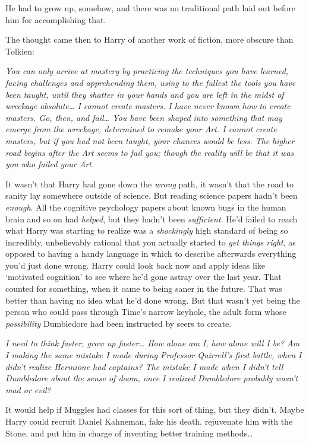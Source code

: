 He had to grow up, somehow, and there was no traditional path laid out before him for accomplishing that.

The thought came then to Harry of another work of fiction, more obscure than Tolkien:

\emph{You can only arrive at mastery by practicing the techniques you have learned, facing challenges and apprehending them, using to the fullest the tools you have been taught, until they shatter in your hands and you are left in the midst of wreckage absolute{\ldots} I cannot create masters. I have never known how to create masters. Go, then, and fail{\ldots} You have been shaped into something that may emerge from the wreckage, determined to remake your Art. I cannot create masters, but if you had not been taught, your chances would be less. The higher road begins after the Art seems to fail you; though the reality will be that it was you who failed your Art.}

It wasn't that Harry had gone down the \emph{wrong} path, it wasn't that the road to sanity lay somewhere outside of science. But reading science papers hadn't been \emph{enough}. All the cognitive psychology papers about known bugs in the human brain and so on had \emph{helped}, but they hadn't been \emph{sufficient}. He'd failed to reach what Harry was starting to realize was a \emph{shockingly} high standard of being so incredibly, unbelievably rational that you actually started to \emph{get things right}, as opposed to having a handy language in which to describe afterwards everything you'd just done wrong. Harry could look back now and apply ideas like `motivated cognition' to see where he'd gone astray over the last year. That counted for something, when it came to being saner in the future. That was better than having no idea what he'd done wrong. But that wasn't yet being the person who could pass through Time's narrow keyhole, the adult form whose \emph{possibility} Dumbledore had been instructed by seers to create.

\emph{I need to think faster, grow up faster{\ldots} How alone am I, how alone will I be? Am I making the same mistake I made during Professor Quirrell's first battle, when I didn't realize Hermione had captains? The mistake I made when I didn't tell Dumbledore about the sense of doom, once I realized Dumbledore probably wasn't mad or evil?}

It would help if Muggles had classes for this sort of thing, but they didn't. Maybe Harry could recruit Daniel Kahneman, fake his death, rejuvenate him with the Stone, and put him in charge of inventing better training methods{\ldots}

